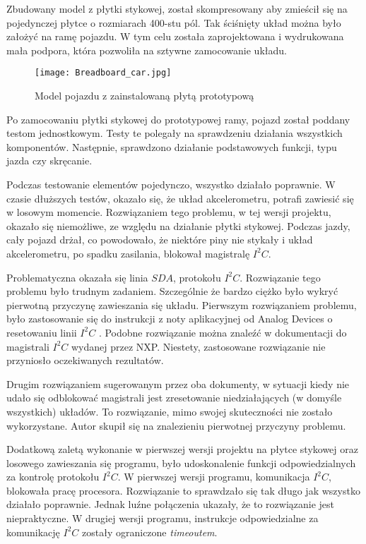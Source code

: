        Zbudowany model z płytki stykowej, został skompresowany aby zmieścił się na pojedynczej płytce o rozmiarach 400-stu pól.
        Tak ściśnięty układ można było założyć na ramę pojazdu.
        W tym celu została zaprojektowana i wydrukowana mała podpora, która pozwoliła na sztywne zamocowanie układu.

        \begin{figure}[!ht]
            \centering
            \texttt{[image: Breadboard\_car.jpg]}
            \caption{Model pojazdu z zainstalowaną płytą prototypową}
            \label{fig:breadboard_car}
        \end{figure}

        Po zamocowaniu płytki stykowej do prototypowej ramy, pojazd został poddany testom jednostkowym.
        Testy te polegały na sprawdzeniu działania wszystkich komponentów.
        Następnie, sprawdzono działanie podstawowych funkcji, typu jazda czy skręcanie.

        Podczas testowanie elementów pojedynczo, wszystko działało poprawnie.
        W czasie dłuższych testów, okazało się, że układ akcelerometru, potrafi zawiesić się w losowym momencie.
        Rozwiązaniem tego problemu, w tej wersji projektu, okazało się niemożliwe, ze względu na działanie płytki stykowej.
        Podczas jazdy, cały pojazd drżał, co powodowało, że niektóre piny nie stykały i układ akcelerometru, po spadku zasilania, blokował magistralę $I^2C$.

        Problematyczna okazała się linia $SDA$, protokołu $I^2C$.
        Rozwiązanie tego problemu było trudnym zadaniem.
        Szczególnie że bardzo ciężko było wykryć pierwotną przyczynę zawieszania się układu.
        Pierwszym rozwiązaniem problemu, było zastosowanie się do instrukcji z noty aplikacyjnej od Analog Devices o resetowaniu linii $I^2C$ \cite{application_note_I2C_AD}.
        Podobne rozwiązanie można znaleźć w dokumentacji do magistrali $I^2C$ \cite{I2C_manual_NXP} wydanej przez NXP.
        Niestety, zastosowane rozwiązanie nie przyniosło oczekiwanych rezultatów.

        Drugim rozwiązaniem sugerowanym przez oba dokumenty, w sytuacji kiedy nie udało się odblokować magistrali jest zresetowanie niedziałających (w domyśle wszystkich) układów.
        To rozwiązanie, mimo swojej skuteczności nie zostało wykorzystane.
        Autor skupił się na znalezieniu pierwotnej przyczyny problemu.

        Dodatkową zaletą wykonanie w pierwszej wersji projektu na płytce stykowej oraz losowego zawieszania się programu, było udoskonalenie funkcji odpowiedzialnych za kontrolę protokołu $I^2C$.
        W pierwszej wersji programu, komunikacja $I^2C$, blokowała pracę procesora.
        Rozwiązanie to sprawdzało się tak długo jak wszystko działało poprawnie.
        Jednak luźne połączenia ukazały, że to rozwiązanie jest niepraktyczne.
        W drugiej wersji programu, instrukcje odpowiedzialne za komunikację $I^2C$ zostały ograniczone \textit{timeoutem}.


